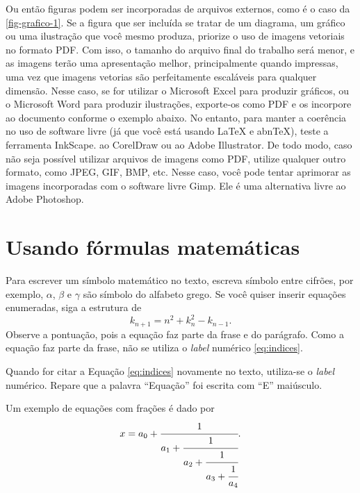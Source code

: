     Ou então figuras podem ser incorporadas de arquivos externos, como é o caso da \autoref{fig-grafico-1}. Se a figura que ser incluída se tratar de um diagrama, um gráfico ou uma ilustração que você mesmo produza, priorize o uso de imagens vetoriais no formato PDF. Com isso, o tamanho do arquivo final do trabalho será menor, e as imagens terão uma apresentação melhor, principalmente quando impressas, uma vez que imagens vetorias são perfeitamente escaláveis para qualquer dimensão. Nesse caso, se for utilizar o Microsoft Excel para produzir gráficos, ou o Microsoft Word para produzir ilustrações, exporte-os como PDF e os incorpore ao documento conforme o exemplo abaixo. No entanto, para manter a coerência no uso de software livre (já que você está usando LaTeX e abnTeX),  teste a ferramenta InkScape. ao CorelDraw ou ao Adobe Illustrator.  De todo modo, caso não seja possível  utilizar arquivos de imagens como PDF, utilize qualquer outro formato, como JPEG, GIF, BMP, etc.  Nesse caso, você pode tentar aprimorar as imagens incorporadas com o software livre Gimp. Ele é uma alternativa livre ao Adobe Photoshop.

\section{Usando fórmulas matemáticas}

Para escrever um símbolo matemático no texto, escreva símbolo entre cifrões, por exemplo, $\alpha$, $\beta$ e $\gamma$ são símbolo do alfabeto grego. Se você quiser inserir equações enumeradas, siga a estrutura de
\begin{equation}
    \label{eq:indices}
	k_{n+1} = n^2 + k_n^2 - k_{n-1}.
\end{equation}
Observe a pontuação, pois a equação faz parte da frase e do parágrafo. Como a equação faz parte da frase, não se utiliza o \textit{label} numérico \ref{eq:indices}. 

Quando for citar a Equação \ref{eq:indices} novamente no texto, utiliza-se o \textit{label} numérico. Repare que a palavra ``Equação'' foi escrita com ``E'' maiúsculo. 

Um exemplo de equações com frações é dado por
\begin{equation}
	\label{eq:fracao}
		\begin{aligned}
			x = a_0 + \cfrac{1}{a_1
				+ \cfrac{1}{a_2
					+ \cfrac{1}{a_3 + \cfrac{1}{a_4} } } }.
		\end{aligned}
	\end{equation}

